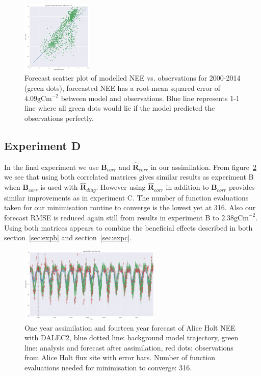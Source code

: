 \documentclass[11pt]{article}
\begin{document}
\begin{figure}[ht]
    \centering
    \includegraphics[width=0.3\textwidth]{bdiagr_corr_cor03_tau4_cutoff4_var05_forecast_scatter.png}
    \caption{Forecast scatter plot of modelled NEE vs. observations for 2000-2014 (green dots), forecasted NEE has a root-mean squared error of $4.09 \text{gCm}^{-2}$ between model and observations. Blue line represents 1-1 line where all green dots would lie if the model predicted the observations perfectly.}
    \label{fig:forecastscatBR}
\end{figure}

\subsection{Experiment D}

In the final experiment we use $\textbf{B}_{corr}$ and $\hat{\textbf{R}}_{corr}$ in our assimilation. From figure~\ref{fig:4dvaredcBcorR} we see that using both correlated matrices gives similar results as experiment B when $\textbf{B}_{corr}$ is used with $\hat{\textbf{R}}_{diag}$. However using $\hat{\textbf{R}}_{corr}$ in addition to $\textbf{B}_{corr}$ provides similar improvements as in experiment C. The number of function evaluations taken for our minimisation routine to converge is the lowest yet at 316. Also our forecast RMSE is reduced again still from results in experiment B to $2.38 \text{gCm}^{-2}$. Using both matrices appears to combine the beneficial effects described in both section~\ref{sec:expb} and section~\ref{sec:expc}.

\begin{figure}[ht]
    \centering
    \includegraphics[width=0.6\textwidth]{b_edcr_corr_cor03_tau4_cutoff4_var05_4dvar.png}
    \caption{One year assimilation and fourteen year forecast of Alice Holt NEE with DALEC2, blue dotted line: background model trajectory, green line: analysis and forecast after assimilation, red dots: observations from Alice Holt flux site with error bars. Number of function evaluations needed for minimisation to converge: 316.}
    \label{fig:4dvaredcBcorR}
\end{figure}
\end{document}
